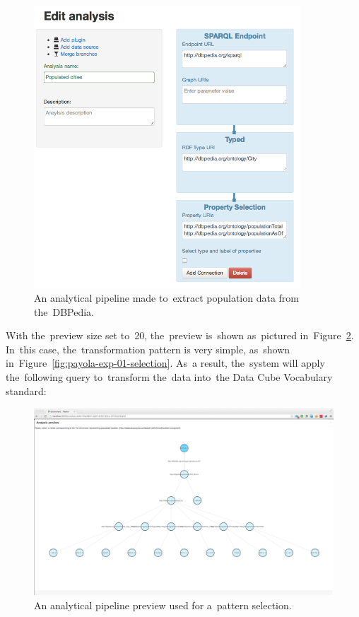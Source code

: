 \begin{figure}
  \centering
  \includegraphics[width=100mm]{img/payola-exp-01-step1.png}
  \caption{An analytical pipeline made to~extract population data from the~DBPedia.}
  \label{fig:dbpedia-pop-anal}
\end{figure}

With the~preview size set to~20, the~preview is~shown as~pictured in~Figure~\ref{fig:payola-exp-01-preview}. In~this case, the~transformation pattern 
is very simple, as~shown in~Figure~\ref{fig:payola-exp-01-selection}. As~a 
result, the~system will apply the~following query to~transform the~data into~the
Data Cube Vocabulary standard:

\begin{figure}
  \centering
  \includegraphics[width=140mm]{img/payola-exp-01-preview.png}
  \caption{An analytical pipeline preview used for a~pattern selection.}
  \label{fig:payola-exp-01-preview}
\end{figure}

